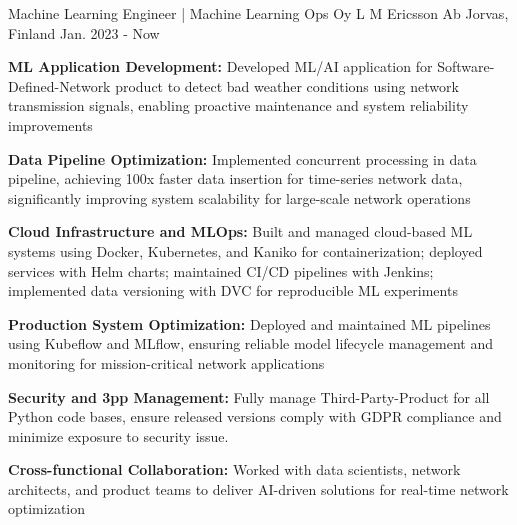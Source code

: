 

\begin{cventries}

    \cventry
            {Machine Learning Engineer | Machine Learning Ops} %
            {Oy L M Ericsson Ab} %
            {Jorvas, Finland} %
            {Jan. 2023 - Now} %
            {
                \begin{cvitems}
                    \item \textbf{ML Application Development:}  Developed ML/AI application for Software-Defined-Network product to detect bad weather conditions using network transmission signals, enabling proactive maintenance and system reliability improvements
                    \item \textbf{Data Pipeline Optimization:}  Implemented concurrent processing in data pipeline, achieving 100x faster data insertion for time-series network data, significantly improving system scalability for large-scale network operations
                    \item \textbf{Cloud Infrastructure and MLOps:}  Built and managed cloud-based ML systems using Docker, Kubernetes, and Kaniko for containerization; deployed services with Helm charts; maintained CI/CD pipelines with Jenkins; implemented data versioning with DVC for reproducible ML experiments
                    \item \textbf{Production System Optimization:} Deployed and maintained ML pipelines using Kubeflow and MLflow, ensuring reliable model lifecycle management and monitoring for mission-critical network applications
                    \item \textbf{Security and 3pp Management:} Fully manage Third-Party-Product for all Python code bases, ensure released versions comply with GDPR compliance and minimize exposure to security issue.
                    \item \textbf{Cross-functional Collaboration:} Worked with data scientists, network architects, and product teams to deliver AI-driven solutions for real-time network optimization

\end{cvitems}}
\end{cventries}
